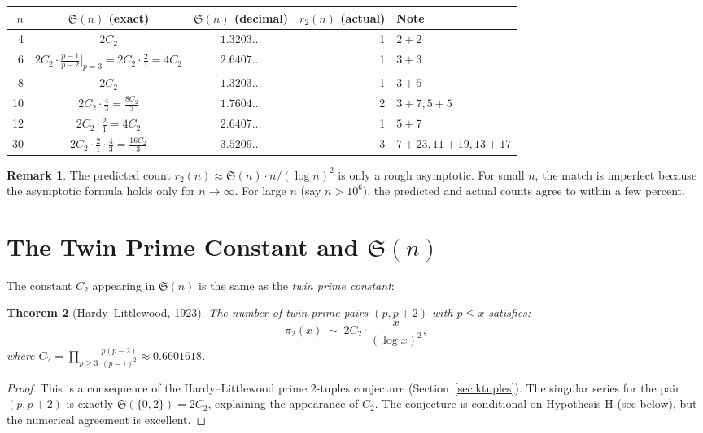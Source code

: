 \documentclass[12pt,a4paper]{amsart}
\newtheorem{theorem}{Theorem}[section]
\theoremstyle{definition}
\newtheorem{remark}[theorem]{Remark}
\begin{document}
\begin{center}
\begin{tabular}{rccrl}
\toprule
$n$ & $\mathfrak{S}(n)$ (exact) & $\mathfrak{S}(n)$ (decimal) & $r_2(n)$ (actual) & Note \\
\midrule
4  & $2C_2$ & $1.3203\ldots$ & 1 & $2+2$ \\
6  & $2 C_2 \cdot \tfrac{p-1}{p-2}\big|_{p=3} = 2C_2\cdot\tfrac{2}{1} = 4C_2$ & $2.6407\ldots$ & 1 & $3+3$ \\
8  & $2C_2$ & $1.3203\ldots$ & 1 & $3+5$ \\
10 & $2 C_2 \cdot \frac{4}{3} = \frac{8C_2}{3}$ & $1.7604\ldots$ & 2 & $3+7, 5+5$ \\
12 & $2 C_2 \cdot \frac{2}{1} = 4C_2$ & $2.6407\ldots$ & 1 & $5+7$ \\
30 & $2 C_2 \cdot \frac{2}{1}\cdot\frac{4}{3} = \frac{16C_2}{3}$ & $3.5209\ldots$ & 3 & $7+23,11+19,13+17$ \\
\bottomrule
\end{tabular}
\end{center}

\begin{remark}
  The predicted count $r_2(n) \approx \mathfrak{S}(n) \cdot n / (\log n)^2$
  is only a rough asymptotic.  For small $n$, the match is imperfect
  because the asymptotic formula holds only for $n \to \infty$.
  For large $n$ (say $n > 10^6$), the predicted and actual counts agree
  to within a few percent.
\end{remark}

\section{The Twin Prime Constant and $\mathfrak{S}(n)$}
\label{sec:twinprime_const}

The constant $C_2$ appearing in $\mathfrak{S}(n)$ is the same as the
\emph{twin prime constant}:

\begin{theorem}[Hardy--Littlewood, 1923]\label{thm:twin_prime_count}
  The number of twin prime pairs $(p, p+2)$ with $p \leq x$ satisfies:
  \[
    \pi_2(x) \;\sim\; 2 C_2 \cdot \frac{x}{(\log x)^2},
  \]
  where $C_2 = \prod_{p \geq 3} \frac{p(p-2)}{(p-1)^2} \approx 0.6601618$.
\end{theorem}

\begin{proof}
  This is a consequence of the Hardy--Littlewood prime 2-tuples conjecture
  (Section~\ref{sec:ktuples}).  The singular series for the pair
  $(p, p+2)$ is exactly $\mathfrak{S}(\{0, 2\}) = 2C_2$, explaining
  the appearance of $C_2$.  The conjecture is conditional on
  Hypothesis H (see below), but the numerical agreement is excellent.
\end{proof}
\end{document}
